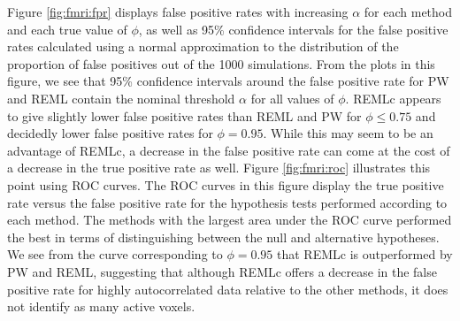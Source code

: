 Figure \ref{fig:fmri:fpr} displays false positive rates with increasing $\alpha$ for each method and each true value of $\phi$, as well as 95\% confidence intervals for the false positive rates calculated using a normal approximation to the distribution of the proportion of false positives out of the 1000 simulations. From the plots in this figure, we see that 95\% confidence intervals around the false positive rate for PW and REML contain the nominal threshold $\alpha$ for all values of $\phi$. REMLc appears to give slightly lower false positive rates than REML and PW for $\phi \le 0.75$ and decidedly lower false positive rates for $\phi = 0.95$. While this may seem to be an advantage of REMLc, a decrease in the false positive rate can come at the cost of a decrease in the true positive rate as well. Figure \ref{fig:fmri:roc} illustrates this point using ROC curves. The ROC curves in this figure display the true positive rate versus the false positive rate for the hypothesis tests performed according to each method. The methods with the largest area under the ROC curve performed the best in terms of distinguishing between the null and alternative hypotheses. We see from the curve corresponding to $\phi = 0.95$ that REMLc is outperformed by PW and REML, suggesting that although REMLc offers a decrease in the false positive rate for highly autocorrelated data relative to the other methods, it does not identify as many active voxels.

